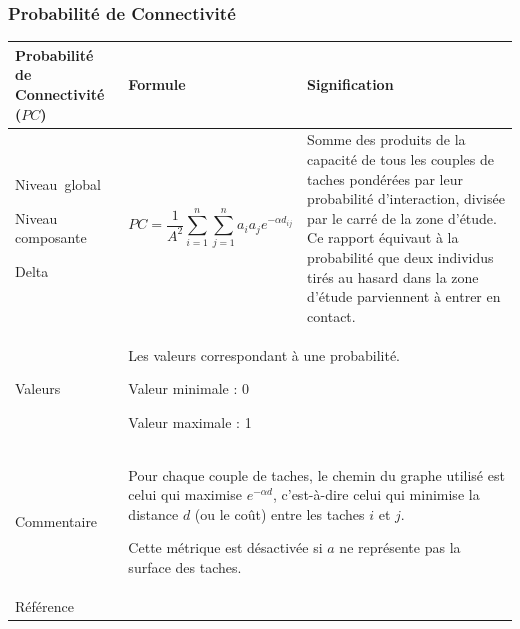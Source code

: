\documentclass{article}
\begin{document}
\subsubsection{Probabilité de Connectivité}
\label{metric_PC}
\begin{table}[H]
\begin{tabular}{|m{3.24cm}|m{4.4810004cm}m{7.924cm}|}

\hline
Probabilité de Connectivité ($PC$) &
\multicolumn{1}{m{4.4810004cm}|}{Formule} &
Signification\\\hline
Niveau~global

Niveau composante

Delta &
\multicolumn{1}{m{4.4810004cm}|}{\begin{equation*}
\mathit{PC}=\frac{1}{{A}^{2}}\sum _{i=1}^{n}{\sum _{j=1}^{n}{{a}_{i}}}{{a}_{j}e}^{-\alpha {d}_{\mathit{ij}}}
\end{equation*}
} &
Somme des produits de la capacité de tous les couples de taches pondérées par leur probabilité d’interaction, divisée par le carré de la zone d’étude. Ce rapport équivaut à la probabilité que deux individus tirés au hasard dans la zone d’étude parviennent à entrer en contact.

\\\hline
Valeurs &
\multicolumn{2}{m{12.6050005cm}|}{Les valeurs correspondant à une probabilité.

Valeur minimale : 0

Valeur maximale : 1
}\\\hline
Commentaire &
\multicolumn{2}{m{12.6050005cm}|}{Pour chaque couple de taches, le chemin du graphe utilisé est celui qui maximise  ${e}^{-\mathit{\alpha d}}$, c’est-à-dire celui qui minimise la distance $d$ (ou le coût) entre les taches $i$ et $j$.

Cette métrique est désactivée si $a$ ne représente pas la surface des taches.

}\\\hline
Référence &
\multicolumn{2}{m{12.6050005cm}|}{\cite{Saura2007}}\\\hline
\end{tabular}
\end{table}
\end{document}
